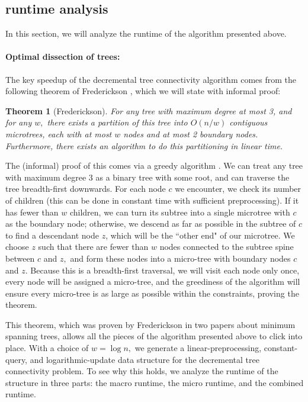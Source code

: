 \documentclass{article}
\newtheorem{theorem}{Theorem}
\begin{document}
\subsection{runtime analysis}
In this section, we will analyze the runtime of the algorithm presented above.

\paragraph{Optimal dissection of trees:}
The key speedup of the decremental tree connectivity algorithm comes from the following theorem of Frederickson \cite{Frederickson}, which we will state with informal proof:

\begin{theorem}[Frederickson]
    For any tree with maximum degree at most 3, and for any $w,$ there exists a partition of this tree into $O(n/w)$ contiguous microtrees, each with at most $w$ nodes and at most 2 boundary nodes. Furthermore, there exists an algorithm to do this partitioning in linear time.
\end{theorem}

The (informal) proof of this comes via a greedy algorithm \cite{BilleSlides}. We can treat any tree with maximum degree 3 as a binary tree with some root, and can traverse the tree breadth-first downwards. For each node $c$ we encounter, we check its number of children (this can be done in constant time with sufficient preprocessing). If it has fewer than $w$ children, we can turn its subtree into a single microtree with $c$ as the boundary node; otherwise, we descend as far as possible in the subtree of $c$ to find a descendant node $z$, which will be the ``other end" of our microtree. We choose $z$ such that there are fewer than $w$ nodes connected to the subtree spine between $c$ and $z,$ and form these nodes into a micro-tree with boundary nodes $c$ and $z.$ Because this is a breadth-first traversal, we will visit each node only once, every node will be assigned a micro-tree, and the greediness of the algorithm will ensure every micro-tree is as large as possible within the constraints, proving the theorem.

This theorem, which was proven by Frederickson in two papers about minimum spanning trees, allows all the pieces of the algorithm presented above to click into place. With a choice of $w=\log n,$ we generate a linear-preprocessing, constant-query, and logarithmic-update data structure for the decremental tree connectivity problem. To see why this holds, we analyze the runtime of the structure in three parts: the macro runtime, the micro runtime, and the combined runtime.
\end{document}
